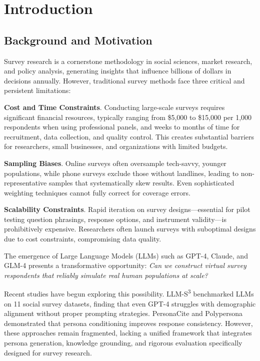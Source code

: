 \documentclass[sigconf,nonarchival]{acmart}
\begin{document}

\section{Introduction}

\subsection{Background and Motivation}

Survey research is a cornerstone methodology in social sciences, market research, and policy analysis, generating insights that influence billions of dollars in decisions annually. However, traditional survey methods face three critical and persistent limitations:

\textbf{Cost and Time Constraints}. Conducting large-scale surveys requires significant financial resources, typically ranging from \$5,000 to \$15,000 per 1,000 respondents when using professional panels, and weeks to months of time for recruitment, data collection, and quality control. This creates substantial barriers for researchers, small businesses, and organizations with limited budgets.

\textbf{Sampling Biases}. Online surveys often oversample tech-savvy, younger populations, while phone surveys exclude those without landlines, leading to non-representative samples that systematically skew results. Even sophisticated weighting techniques cannot fully correct for coverage errors.

\textbf{Scalability Constraints}. Rapid iteration on survey designs—essential for pilot testing question phrasings, response options, and instrument validity—is prohibitively expensive. Researchers often launch surveys with suboptimal designs due to cost constraints, compromising data quality.

The emergence of Large Language Models (LLMs) such as GPT-4, Claude, and GLM-4 presents a transformative opportunity: \textit{Can we construct virtual survey respondents that reliably simulate real human populations at scale?}

Recent studies have begun exploring this possibility. LLM-S\textsuperscript{3} benchmarked LLMs on 11 social survey datasets, finding that even GPT-4 struggles with demographic alignment without proper prompting strategies. PersonaCite and Polypersona demonstrated that persona conditioning improves response consistency. However, these approaches remain fragmented, lacking a unified framework that integrates persona generation, knowledge grounding, and rigorous evaluation specifically designed for survey research.
\end{document}
